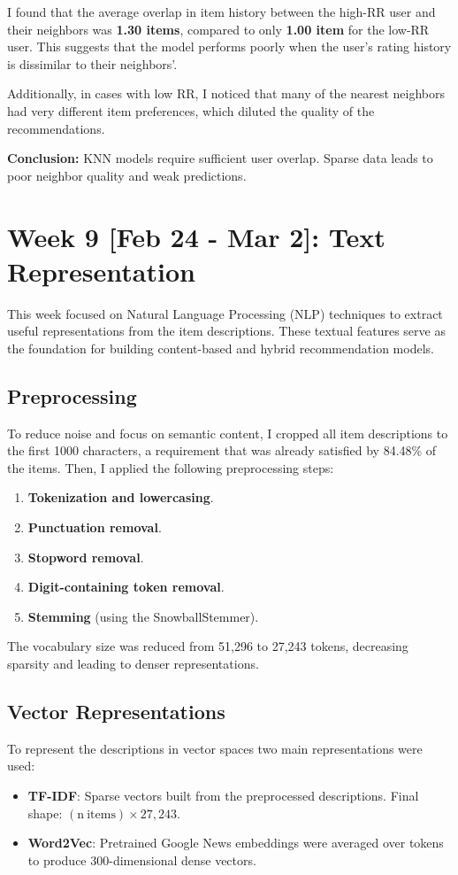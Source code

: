 \documentclass[11pt,a4paper]{article}
\begin{document}
I found that the average overlap in item history between the high-RR user and their neighbors was \textbf{1.30 items}, compared to only \textbf{1.00 item} for the low-RR user. This suggests that the model performs poorly when the user’s rating history is dissimilar to their neighbors'.

Additionally, in cases with low RR, I noticed that many of the nearest neighbors had very different item preferences, which diluted the quality of the recommendations.

\textbf{Conclusion:} KNN models require sufficient user overlap. Sparse data leads to poor neighbor quality and weak predictions.

\section{Week 9 [Feb 24 - Mar 2]: Text Representation}

This week focused on Natural Language Processing (NLP) techniques to extract useful representations from the item descriptions. These textual features serve as the foundation for building content-based and hybrid recommendation models.

\subsection{Preprocessing}
To reduce noise and focus on semantic content, I cropped all item descriptions to the first 1000 characters, a requirement that was already satisfied by 84.48\% of the items. Then, I applied the following preprocessing steps:
\begin{enumerate}
    \item \textbf{Tokenization and lowercasing}.
    \item \textbf{Punctuation removal}.
    \item \textbf{Stopword removal}.
    \item \textbf{Digit-containing token removal}.
    \item \textbf{Stemming} (using the SnowballStemmer).
\end{enumerate}
The vocabulary size was reduced from 51,296 to 27,243 tokens, decreasing sparsity and leading to denser representations.

\subsection{Vector Representations}
To represent the descriptions in vector spaces two main representations were used:
\begin{itemize}
    \item \textbf{TF-IDF}: Sparse vectors built from the preprocessed descriptions. Final shape: $(\mathrm{n\ items}) \times 27{,}243$.
    \item \textbf{Word2Vec}: Pretrained Google News embeddings were averaged over tokens to produce 300-dimensional dense vectors.
\end{itemize}
\end{document}
